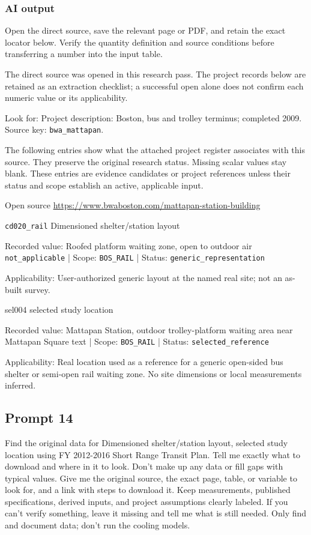 \subsubsection*{AI output}
Open the direct source, save the relevant page or PDF, and retain the exact locator below. Verify the quantity definition and source conditions before transferring a number into the input table.

The direct source was opened in this research pass. The project records below are retained as an extraction checklist; a successful open alone does not confirm each numeric value or its applicability.

Look for: Project description: Boston, bus and trolley terminus; completed 2009. Source key: \nolinkurl{bwa_mattapan}.

The following entries show what the attached project register associates with this source. They preserve the original research status. Missing scalar values stay blank. These entries are evidence candidates or project references unless their status and scope establish an active, applicable input.

Open source  \url{https://www.bwaboston.com/mattapan-station-building}

\nolinkurl{cd020_rail}  Dimensioned shelter/station layout

Recorded value: Roofed platform waiting zone, open to outdoor air \nolinkurl{not_applicable} | Scope: \nolinkurl{BOS_RAIL} | Status: \nolinkurl{generic_representation}

Applicability: User-authorized generic layout at the named real site; not an as-built survey.

sel004  selected study location

Recorded value: Mattapan Station, outdoor trolley-platform waiting area near Mattapan Square text | Scope: \nolinkurl{BOS_RAIL} | Status: \nolinkurl{selected_reference}

Applicability: Real location used as a reference for a generic open-sided bus shelter or semi-open rail waiting zone. No site dimensions or local measurements inferred.

\subsection*{Prompt 14}
Find the original data for Dimensioned shelter/station layout, selected study location using FY 2012-2016 Short Range Transit Plan. Tell me exactly what to download and where in it to look. Don’t make up any data or fill gaps with typical values. Give me the original source, the exact page, table, or variable to look for, and a link with steps to download it. Keep measurements, published specifications, derived inputs, and project assumptions clearly labeled. If you can’t verify something, leave it missing and tell me what is still needed. Only find and document data; don’t run the cooling models.

